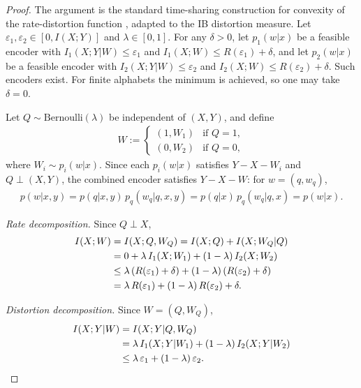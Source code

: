 \documentclass[11pt]{article}
\begin{document}
\begin{proof}
The argument is the standard time-sharing construction for convexity
of the rate-distortion function \cite[Theorem~10.2.1]{cover2006elements},
adapted to the IB distortion measure.
Let $\varepsilon_1,\varepsilon_2\in[0,I(X;Y)]$ and
$\lambda\in[0,1]$.
For any $\delta>0$, let $p_1(w|x)$ be a feasible encoder with
$I_1(X;Y|W)\leq\varepsilon_1$ and
$I_1(X;W)\leq R(\varepsilon_1)+\delta$, and
let $p_2(w|x)$ be a feasible encoder with
$I_2(X;Y|W)\leq\varepsilon_2$ and
$I_2(X;W)\leq R(\varepsilon_2)+\delta$.
Such encoders exist. For finite alphabets the minimum is achieved,
so one may take $\delta=0$.

Let $Q\sim\mathrm{Bernoulli}(\lambda)$ be independent of $(X,Y)$,
and define
\begin{align}
    W := \begin{cases}
    (1,W_1) & \text{if } Q=1, \\
    (0,W_2) & \text{if } Q=0,
    \end{cases}
\end{align}
where $W_i\sim p_i(w|x)$.
Since each $p_i(w|x)$ satisfies $Y-X-W_i$ and $Q\perp(X,Y)$, the
combined encoder satisfies $Y-X-W$: for $w=(q,w_q)$,
\begin{align}
    p(w|x,y) = p(q|x,y)\,p_q(w_q|q,x,y) = p(q|x)\,p_q(w_q|q,x) = p(w|x).
\end{align}

\textit{Rate decomposition.}
Since $Q\perp X$,
\begin{align}
    I(X;W) &= I(X;Q,W_Q) = I(X;Q) + I(X;W_Q|Q) \notag\\
    &= 0 + \lambda\,I_1(X;W_1) + (1-\lambda)\,I_2(X;W_2) \notag\\
    &\leq \lambda\,(R(\varepsilon_1)+\delta)
    + (1-\lambda)\,(R(\varepsilon_2)+\delta) \notag\\
    &= \lambda\,R(\varepsilon_1) + (1-\lambda)\,R(\varepsilon_2)
    + \delta.
    \label{eq:rate_ts}
\end{align}

\textit{Distortion decomposition.}
Since $W=(Q,W_Q)$,
\begin{align}
    I(X;Y|W) &= I(X;Y|Q,W_Q) \notag\\
    &= \lambda\,I_1(X;Y|W_1) + (1-\lambda)\,I_2(X;Y|W_2) \notag\\
    &\leq \lambda\,\varepsilon_1 + (1-\lambda)\,\varepsilon_2.
    \label{eq:dist_ts}
\end{align}


\end{proof}
\end{document}
